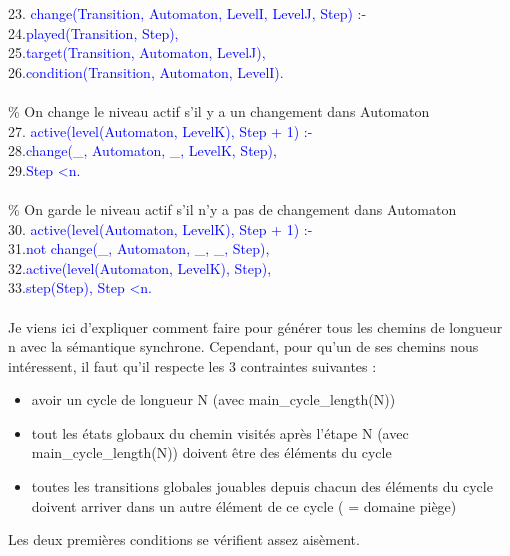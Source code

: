 \documentclass[12pt,a4paper]{article}
\begin{document}
{	23. \textcolor{blue}{change(Transition, Automaton, LevelI, LevelJ, Step) :-}\\
	24.\qquad\qquad\textcolor{blue}{played(Transition, Step),}\\
	25.\qquad\qquad\textcolor{blue}{target(Transition, Automaton, LevelJ),}\\
	26.\qquad\qquad\textcolor{blue}{condition(Transition, Automaton, LevelI).}\\ \\
	\% On change le niveau actif s'il y a un changement dans Automaton\\
	27. \textcolor{blue}{active(level(Automaton, LevelK), Step + 1) :-}\\
	28.\qquad\qquad\textcolor{blue}{change(\_, Automaton, \_, LevelK, Step),}\\
	29.\qquad\qquad\textcolor{blue}{Step \textless n.}\\ \\
	\% On garde le niveau actif s'il n'y a pas de changement dans Automaton\\
	30. \textcolor{blue}{active(level(Automaton, LevelK), Step + 1) :-}\\
	31.\qquad\qquad\textcolor{blue}{not change(\_, Automaton, \_, \_, Step),}\\
	32.\qquad\qquad\textcolor{blue}{active(level(Automaton, LevelK), Step),}\\
	33.\qquad\qquad\textcolor{blue}{step(Step), Step \textless n.}\\ \\
}
Je viens ici d'expliquer comment faire pour générer tous les chemins de longueur n avec la sémantique synchrone. Cependant, pour qu'un de ses chemins nous intéressent, il faut qu'il respecte les $3$ contraintes suivantes :\\
\begin{itemize}
	\item avoir un cycle de longueur N (avec main\_cycle\_length(N))
	\item tout les états globaux du chemin visités après l'étape N (avec main\_cycle\_length(N)) doivent être des éléments du cycle
	\item toutes les transitions globales jouables depuis chacun des éléments du cycle doivent arriver dans un autre élément de ce cycle ( = domaine piège)\\
\end{itemize}
Les deux premières conditions se vérifient assez aisèment.\\ \\
\end{document}
